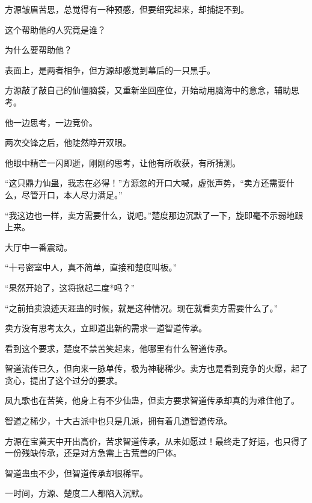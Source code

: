 \begin{this_body}
方源皱眉苦思，总觉得有一种预感，但要细究起来，却捕捉不到。

这个帮助他的人究竟是谁？

为什么要帮助他？

表面上，是两者相争，但方源却感觉到幕后的一只黑手。

方源敲了敲自己的仙僵脑袋，又重新坐回座位，开始动用脑海中的意念，辅助思考。

他一边思考，一边竞价。

两次交锋之后，他陡然睁开双眼。

他眼中精芒一闪即逝，刚刚的思考，让他有所收获，有所猜测。

“这只鼎力仙蛊，我志在必得！”方源忽的开口大喊，虚张声势，“卖方还需要什么，尽管开口，本人尽力满足。”

“我这边也一样，卖方需要什么，说吧。”楚度那边沉默了一下，旋即毫不示弱地跟上来。

大厅中一番震动。

“十号密室中人，真不简单，直接和楚度叫板。”

“果然开始了，这将掀起二度*吗？”

“之前拍卖浪迹天涯蛊的时候，就是这种情况。现在就看卖方需要什么了。”

卖方没有思考太久，立即道出新的需求一道智道传承。

看到这个要求，楚度不禁苦笑起来，他哪里有什么智道传承。

智道流传已久，但向来一脉单传，极为神秘稀少。卖方也是看到竞争的火爆，起了贪心，提出了这个过分的要求。

凤九歌也在苦笑，他身上有不少仙蛊，但卖方要求智道传承却真的为难住他了。

智道之稀少，十大古派中也只是几派，拥有着几道智道传承。

方源在宝黄天中开出高价，苦求智道传承，从未如愿过！最终走了好运，也只得了一份残缺传承，还是对方急需上古荒兽的尸体。

智道蛊虫不少，但智道传承却很稀罕。

一时间，方源、楚度二人都陷入沉默。

\end{this_body}


